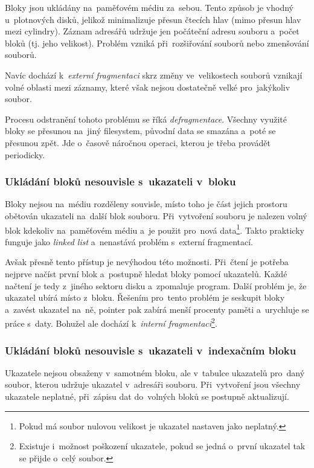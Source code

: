 Bloky jsou ukládány na~paměťovém médiu za~sebou. Tento způsob je vhodný u~plotnových disků, jelikož minimalizuje přesun čtecích hlav (mimo přesun hlav mezi cylindry). Záznam adresářů udržuje jen počáteční adresu souboru a~počet bloků (tj. jeho velikost). Problém vzniká při~rozšiřování souborů nebo zmenšování souborů.

Navíc dochází k~\emph{externí fragmentaci} skrz změny ve~velikostech souborů vznikají volné oblasti mezi záznamy, které však nejsou dostatečně velké pro~jakýkoliv soubor.

Procesu odstranění tohoto problému se říká \emph{defragmentace}. Všechny využité bloky se přesunou na~jiný filesystem, původní data se smazána a~poté se přesunou zpět. Jde o~časově náročnou operaci, kterou je třeba provádět periodicky.

\subsubsection{Ukládání bloků nesouvisle s~ukazateli v~bloku}

Bloky nejsou na~médiu rozděleny souvisle, místo toho je část jejich prostoru obětován ukazateli na~další blok souboru. Při~vytvoření souboru je nalezen volný blok kdekoliv na~paměťovém médiu a~je použit pro~nová data\footnote{Pokud má soubor nulovou velikost je ukazatel nastaven jako neplatný.}. Takto prakticky funguje jako \emph{linked list} a~nenastává problém s~externí fragmentací.

Avšak přesně tento přístup je nevýhodou této možnosti. Při~čtení je potřeba nejprve načíst první blok a~postupně hledat bloky pomocí ukazatelů. Každé načtení je tedy z~jiného sektoru disku a~zpomaluje program. Další problém je, že ukazatel ubírá místo z~bloku. Řešením pro~tento problém je seskupit bloky a~zavést ukazatel na~ně, pointer pak zabírá menší procenty paměti a~urychluje se práce s~daty. Bohužel ale dochází k~\emph{interní fragmentaci}\footnote{Existuje i~možnost poškození ukazatele, pokud se jedná o~první ukazatel tak se přijde o~celý soubor.}.

\subsubsection{Ukládání bloků nesouvisle s~ukazateli v~indexačním bloku}

Ukazatele nejsou obsaženy v~samotném bloku, ale v~tabulce ukazatelů pro~daný soubor, kterou udržuje ukazatel v~adresáři souboru. Při~vytvoření jsou všechny ukazatele neplatné, při~zápisu dat do~volných bloků se postupně aktualizují.

